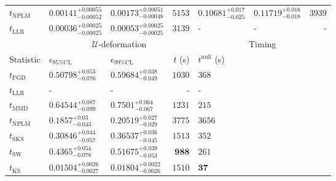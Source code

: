 \begin{tabular}{l|llr|llr}
\rowcolor{red!35}	$t_{\mathrm{NPLM}}$ & $0.00141_{-0.00052}^{+0.00055}$ & $0.00173_{-0.00048}^{+0.00051}$ & $5153$ & $0.10681_{-0.025}^{+0.017}$ & $0.11719_{-0.018}^{+0.016}$ & $3939$ \\
	$t_{\mathrm{LLR}}$ & $0.00036_{-0.00025}^{+0.00025}$ & $0.00053_{-0.00025}^{+0.00025}$ & $3139$ & - & - & - \\
	\toprule
	\multicolumn{1}{c}{} & \multicolumn{3}{c}{$\mathcal{U}$-deformation} & \multicolumn{3}{c}{Timing} \\
	Statistic & $\epsilon_{95\%\mathrm{CL}}$ & $\epsilon_{99\%\mathrm{CL}}$ & $t$ (s) & $t^{\mathrm{null}}$ (s) \\
	\midrule
	$t_{\mathrm{FGD}}$ & $0.50798_{-0.076}^{+0.053}$ & $0.59684_{-0.049}^{+0.038}$ & $1030$ & $368$ \\
	$t_{\mathrm{LLR}}$ & - & - & - & - \\
	$t_{\mathrm{MMD}}$ & $0.64544_{-0.099}^{+0.087}$ & $0.7501_{-0.067}^{+0.064}$ & $1231$ & $215$ \\
\rowcolor{red!35}	$t_{\mathrm{NPLM}}$ & $0.1857_{-0.043}^{+0.03}$ & $0.20519_{-0.029}^{+0.027}$ & $3775$ & $3656$ \\
	$t_{\mathrm{SKS}}$ & $0.30846_{-0.057}^{+0.044}$ & $0.36537_{-0.045}^{+0.036}$ & $1513$ & $352$ \\
	$t_{\mathrm{SW}}$ & $0.4365_{-0.078}^{+0.054}$ & $0.51675_{-0.053}^{+0.039}$ & ${\mathbf{988}}$ & $261$ \\
	$t_{\overline{\mathrm{KS}}}$ & ${\mathbf{0.01504_{-0.0027}^{+0.0026}}}$ & ${\mathbf{0.01804_{-0.0026}^{+0.0022}}}$ & $1510$ & ${\mathbf{37}}$ \\
	\bottomrule
\end{tabular}